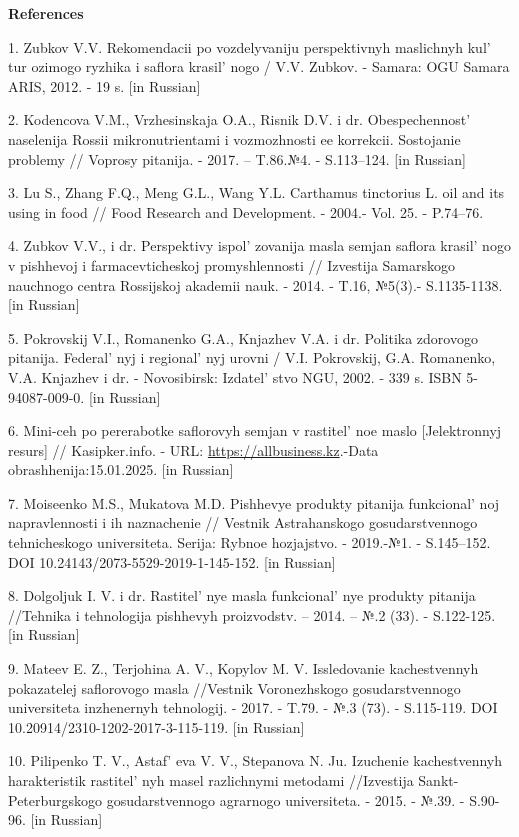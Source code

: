 \begin{center}
{\bfseries References}
\end{center}

\begin{references}
1. Zubkov V.V. Rekomendacii po vozdelyvaniju perspektivnyh maslichnyh
kul' tur ozimogo ryzhika i saflora
krasil' nogo / V.V. Zubkov. - Samara: OGU Samara ARIS,
2012. - 19 s. {[}in Russian{]}

2. Kodencova V.M., Vrzhesinskaja O.A., Risnik D.V. i dr.
Obespechennost'{} naselenija Rossii mikronutrien\-tami i
vozmozhnosti ee korrekcii. Sostojanie problemy // Voprosy pitanija. -
2017. -- T.86.№4. - S.113--124. {[}in Russian{]}

3. Lu S., Zhang F.Q., Meng G.L., Wang Y.L. Carthamus tinctorius L. oil
and its using in food // Food Research and Development. - 2004.- Vol.
25. - P.74--76.

4. Zubkov V.V., i dr. Perspektivy ispol' zovanija masla
semjan saflora krasil' nogo v pishhevoj i
farmacevti\-cheskoj promyshlennosti // Izvestija Samarskogo nauchnogo
centra Rossijskoj akademii nauk. - 2014. - T.16, №5(3).- S.1135-1138.
{[}in Russian{]}

5. Pokrovskij V.I., Romanenko G.A., Knjazhev V.A. i dr. Politika
zdorovogo pitanija. Federal' nyj i
regional' nyj urovni / V.I. Pokrovskij, G.A. Romanenko,
V.A. Knjazhev i dr. - Novosibirsk: Izdatel' stvo NGU,
2002. - 339 s. ISBN 5-94087-009-0. {[}in Russian{]}

6. Mini-ceh po pererabotke saflorovyh semjan v
rastitel' noe maslo {[}Jelektronnyj resurs{]} //
Kasipker.info. - URL:
\href{https://allbusiness.kz/mini-proizvodstvo/74-mini-ceh-po-pererabotke-saflorovyh-semyan-v-rastitelnoe-maslo.html}{https://allbusiness.kz}.-Data
obrashhenija:15.01.2025. {[}in Russian{]}

7. Moiseenko M.S., Mukatova M.D. Pishhevye produkty pitanija
funkcional' noj napravlennosti i ih nazna\-chenie //
Vestnik Astrahanskogo gosudarstvennogo tehnicheskogo universiteta.
Serija: Rybnoe hozjajstvo. - 2019.-№1. - S.145--152. DOI
10.24143/2073-5529-2019-1-145-152. {[}in Russian{]}

8. Dolgoljuk I. V. i dr. Rastitel' nye masla
funkcional' nye produkty pitanija //Tehnika i tehnologija
pishhevyh proizvodstv. -- 2014. -- №.2 (33). - S.122-125. {[}in
Russian{]}

9. Mateev E. Z., Terjohina A. V., Kopylov M. V. Issledovanie
kachestvennyh pokazatelej saflorovogo masla //Vestnik Voronezhskogo
gosudarstvennogo universiteta inzhenernyh tehnologij. - 2017. - T.79. -
№.3 (73). - S.115-119. DOI 10.20914/2310-1202-2017-3-115-119. {[}in
Russian{]}

10. Pilipenko T. V., Astaf' eva V. V., Stepanova N. Ju.
Izuchenie kachestvennyh harakteristik rastitel' nyh masel
razlichnymi metodami //Izvestija Sankt-Peterburgskogo gosudarstvennogo
agrarnogo universiteta. - 2015. - №.39. - S.90-96. {[}in Russian{]}
\end{references}

